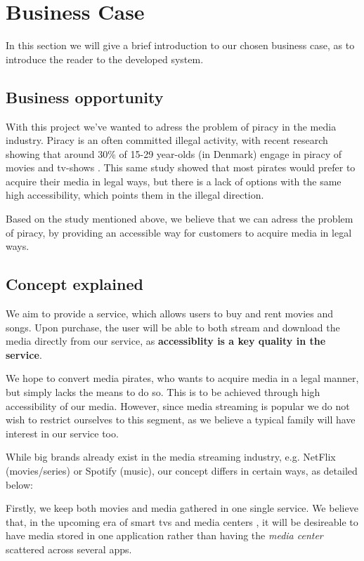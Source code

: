 \section{Business Case}
In this section we will give a brief introduction to our chosen business case, as to introduce the reader to the developed system.

\subsection{Business opportunity}
With this project we've wanted to adress the problem of piracy in the media industry. Piracy is an often committed illegal activity, with recent research showing that around 30\% of 15-29 year-olds (in Denmark) engage in piracy of movies and tv-shows \cite{pirates}. This same study showed that most pirates would prefer to acquire their media in legal ways, but there is a lack of options with the same high accessibility, which points them in the illegal direction.

Based on the study mentioned above, we believe that we can adress the problem of piracy, by providing an accessible way for customers to acquire media in legal ways.

\subsection{Concept explained}
We aim to provide a service, which allows users to buy and rent movies and songs. Upon purchase, the user will be able to both stream and download the media directly from our service, as \textbf{accessiblity is a key quality in the service}.

We hope to convert media pirates, who wants to acquire media in a legal manner, but simply lacks the means to do so. This is to be achieved through high accessibility of our media. However, since media streaming is popular\cite{ott} we do not wish to restrict ourselves to this segment, as we believe a typical  family will have interest in our service too.

While big brands already exist in the media streaming industry, e.g. NetFlix (movies/series) or Spotify (music), our concept differs in certain ways, as detailed below:

Firstly, we keep both movies and media gathered in one single service. We believe that, in the upcoming era of smart tvs and media centers \cite{smarttv}, it will be desireable to have media stored in one application rather than having the \emph{media center} scattered across several apps.

